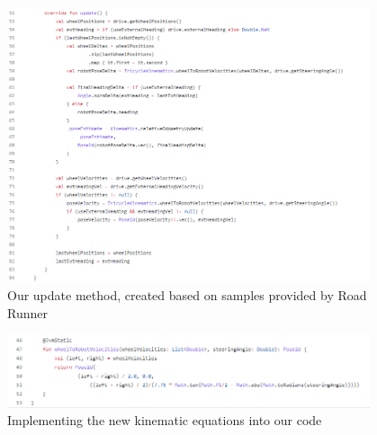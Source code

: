 \begin{figure}[htp]
\centering
\includegraphics[width=0.95\textwidth, angle=0]{Meetings/January/01-11-22/1.13.22 tricyledrive.kt - James Hu.PNG}
\caption{Our update method, created based on samples provided by Road Runner}
\label{fig:011122_1}
\end{figure}

\begin{figure}[htp]
\centering
\includegraphics[width=0.95\textwidth, angle=0]{Meetings/January/01-11-22/1.13.22 tricyledrivekinematics.kt - James Hu.PNG}
\caption{Implementing the new kinematic equations into our code}
\label{fig:011122_2}
\end{figure}



